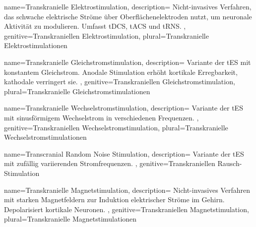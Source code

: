 

{
	name=Transkranielle Elektrostimulation,
	description={
			Nicht-invasives Verfahren, das schwache elektrische Ströme über Oberflächenelektroden nutzt, um neuronale Aktivität zu modulieren. Umfasst \gls{tDCS}, \gls{tACS} und \gls{tRNS}. \cite{woods_technical_2016}\newline
		},
	genitive=Transkraniellen Elektrostimulation,
	plural=Transkranielle Elektrostimulationen
}


{
	name=Transkranielle Gleichstromstimulation,
	description={
			Variante der \gls{tES} mit konstantem Gleichstrom. Anodale Stimulation erhöht kortikale Erregbarkeit, kathodale verringert sie. \cite{woods_technical_2016, thair_transcranial_2017}\newline
		},
	genitive=Transkraniellen Gleichstromstimulation,
	plural=Transkranielle Gleichstromstimulationen
}


{
	name=Transkranielle Wechselstromstimulation,
	description={
			Variante der \gls{tES} mit sinusförmigem Wechselstrom in verschiedenen Frequenzen.
		},
	genitive=Transkraniellen Wechselstromstimulation,
	plural=Transkranielle Wechselstromstimulationen
}


{
	name=Transcranial Random Noise Stimulation,
	description={
			Variante der \gls{tES} mit zufällig variierenden Stromfrequenzen.\newline
		},
	genitive=Transkraniellen Rausch-Stimulation
}


{
	name=Transkranielle Magnetstimulation,
	description={
			Nicht-invasives Verfahren mit starken Magnetfeldern zur Induktion elektrischer Ströme im Gehirn. Depolarisiert kortikale Neuronen. \cite{doccheck_transkranielle_nodate-1}\newline
		},
	genitive=Transkraniellen Magnetstimulation,
	plural=Transkranielle Magnetstimulationen
}

